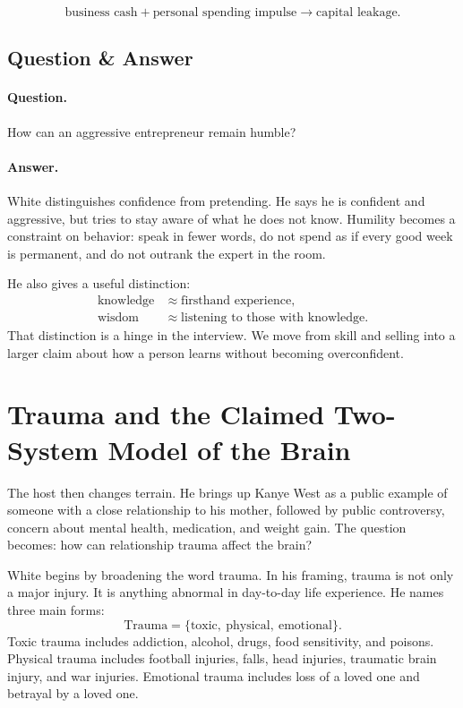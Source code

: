 \begin{equation}
\text{business cash}
+
\text{personal spending impulse}
\longrightarrow
\text{capital leakage}.
\end{equation}

\subsection{Question \& Answer}

\paragraph{Question.} How can an aggressive entrepreneur remain humble?

\paragraph{Answer.} White distinguishes confidence from pretending. He says he is confident and aggressive, but tries to stay aware of what he does not know. Humility becomes a constraint on behavior: speak in fewer words, do not spend as if every good week is permanent, and do not outrank the expert in the room.

He also gives a useful distinction:
\begin{align}
\text{knowledge} &\approx \text{firsthand experience},\\
\text{wisdom} &\approx \text{listening to those with knowledge}.
\end{align}
That distinction is a hinge in the interview. We move from skill and selling into a larger claim about how a person learns without becoming overconfident.

\section{Trauma and the Claimed Two-System Model of the Brain}

The host then changes terrain. He brings up Kanye West as a public example of someone with a close relationship to his mother, followed by public controversy, concern about mental health, medication, and weight gain. The question becomes: how can relationship trauma affect the brain?

White begins by broadening the word trauma. In his framing, trauma is not only a major injury. It is anything abnormal in day-to-day life experience. He names three main forms:
\begin{equation}
\text{Trauma}
=
\{\text{toxic},\ \text{physical},\ \text{emotional}\}.
\end{equation}
Toxic trauma includes addiction, alcohol, drugs, food sensitivity, and poisons. Physical trauma includes football injuries, falls, head injuries, traumatic brain injury, and war injuries. Emotional trauma includes loss of a loved one and betrayal by a loved one.

